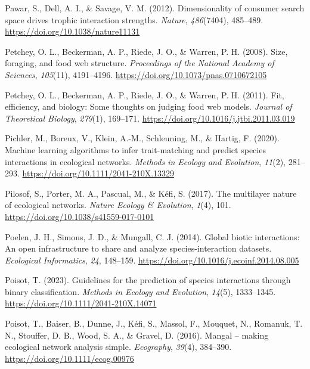 \documentclass[
]{article}
\newlength{\cslhangindent}
\newenvironment{CSLReferences}[2] %
 {\begin{list}{}{%
  \setlength{\itemindent}{0pt}
  \setlength{\leftmargin}{0pt}
  \setlength{\parsep}{0pt}
  \ifodd #1
   \setlength{\leftmargin}{\cslhangindent}
   \setlength{\itemindent}{-1\cslhangindent}
  \fi
  \setlength{\itemsep}{#2\baselineskip}}}
 {\end{list}}
\begin{document}
\begin{CSLReferences}{1}{0}
Pawar, S., Dell, A. I., \& Savage, V. M. (2012). Dimensionality of
consumer search space drives trophic interaction strengths.
\emph{Nature}, \emph{486}(7404), 485--489.
\url{https://doi.org/10.1038/nature11131}

Petchey, O. L., Beckerman, A. P., Riede, J. O., \& Warren, P. H. (2008).
Size, foraging, and food web structure. \emph{Proceedings of the
National Academy of Sciences}, \emph{105}(11), 4191--4196.
\url{https://doi.org/10.1073/pnas.0710672105}

Petchey, O. L., Beckerman, A. P., Riede, J. O., \& Warren, P. H. (2011).
Fit, efficiency, and biology: {Some} thoughts on judging food web
models. \emph{Journal of Theoretical Biology}, \emph{279}(1), 169--171.
\url{https://doi.org/10.1016/j.jtbi.2011.03.019}

Pichler, M., Boreux, V., Klein, A.-M., Schleuning, M., \& Hartig, F.
(2020). Machine learning algorithms to infer trait-matching and predict
species interactions in ecological networks. \emph{Methods in Ecology
and Evolution}, \emph{11}(2), 281--293.
\url{https://doi.org/10.1111/2041-210X.13329}

Pilosof, S., Porter, M. A., Pascual, M., \& Kéfi, S. (2017). The
multilayer nature of ecological networks. \emph{Nature Ecology \&
Evolution}, \emph{1}(4), 101.
\url{https://doi.org/10.1038/s41559-017-0101}

Poelen, J. H., Simons, J. D., \& Mungall, C. J. (2014). Global biotic
interactions: {An} open infrastructure to share and analyze
species-interaction datasets. \emph{Ecological Informatics}, \emph{24},
148--159. \url{https://doi.org/10.1016/j.ecoinf.2014.08.005}

Poisot, T. (2023). Guidelines for the prediction of species interactions
through binary classification. \emph{Methods in Ecology and Evolution},
\emph{14}(5), 1333--1345. \url{https://doi.org/10.1111/2041-210X.14071}

Poisot, T., Baiser, B., Dunne, J., Kéfi, S., Massol, F., Mouquet, N.,
Romanuk, T. N., Stouffer, D. B., Wood, S. A., \& Gravel, D. (2016).
Mangal -- making ecological network analysis simple. \emph{Ecography},
\emph{39}(4), 384--390. \url{https://doi.org/10.1111/ecog.00976}


\end{CSLReferences}
\end{document}
